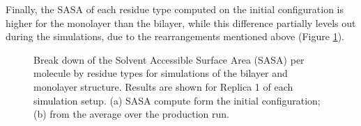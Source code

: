 Finally, the SASA of each residue type computed on the initial configuration is higher for the monolayer than the bilayer, while this difference partially levels out during the simulations, due to the rearrangements mentioned above (Figure \ref{fig:mono_bi_sasa}).
\begin{figure}[p!]
\centering
\hspace{0.4cm}
\caption[SASA per residue of monolayer and bilater]{Break down of the Solvent Accessible Surface Area (SASA) per molecule by residue types for simulations of the bilayer and monolayer structure. Results are shown for Replica 1 of each simulation setup. (a) SASA compute form the initial configuration; (b) from the average over the production run.}
\label{fig:mono_bi_sasa}
\end{figure}




